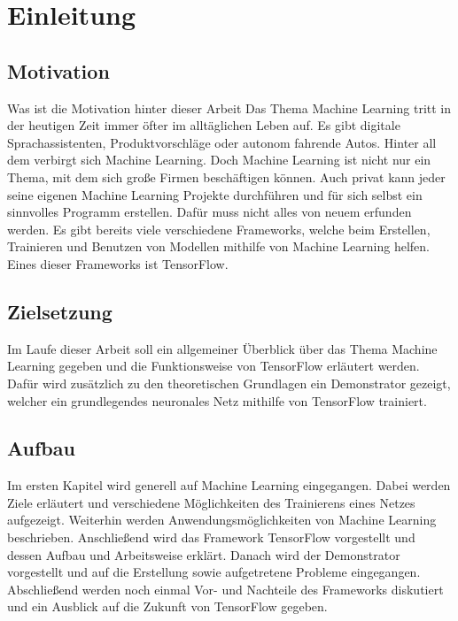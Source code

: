 \chapter{Einleitung}  
\label{chap:einleitung}
\chapterauthor{\authorMarco}

\section{Motivation}
\label{sec:motivation}
Was ist die Motivation hinter dieser Arbeit
Das Thema Machine Learning tritt in der heutigen Zeit immer öfter im alltäglichen Leben auf. Es gibt digitale Sprachassistenten, Produktvorschläge oder autonom fahrende Autos. Hinter all dem verbirgt sich Machine Learning. Doch Machine Learning ist nicht nur ein Thema, mit dem sich große Firmen beschäftigen können. Auch privat kann jeder seine eigenen Machine Learning Projekte durchführen und für sich selbst ein sinnvolles Programm erstellen. Dafür muss nicht alles von neuem erfunden werden. Es gibt bereits viele verschiedene Frameworks, welche beim Erstellen, Trainieren und Benutzen von Modellen mithilfe von Machine Learning helfen. Eines dieser Frameworks ist TensorFlow.

\section{Zielsetzung}
\label{sec:zielsetzung}
Im Laufe dieser Arbeit soll ein allgemeiner Überblick über das Thema Machine Learning gegeben und die Funktionsweise von TensorFlow erläutert werden. Dafür wird zusätzlich zu den theoretischen Grundlagen ein Demonstrator gezeigt, welcher ein grundlegendes neuronales Netz mithilfe von TensorFlow trainiert.

\section{Aufbau}
\label{sec:aufbauArbeit}
Im ersten Kapitel wird generell auf Machine Learning eingegangen. Dabei werden Ziele erläutert und verschiedene Möglichkeiten des Trainierens eines Netzes aufgezeigt. Weiterhin werden Anwendungsmöglichkeiten von Machine Learning beschrieben. Anschließend wird das Framework TensorFlow vorgestellt und dessen Aufbau und Arbeitsweise erklärt. Danach wird der Demonstrator vorgestellt und auf die Erstellung sowie aufgetretene Probleme eingegangen. Abschließend werden noch einmal Vor- und Nachteile des Frameworks diskutiert und ein Ausblick auf die Zukunft von TensorFlow gegeben.